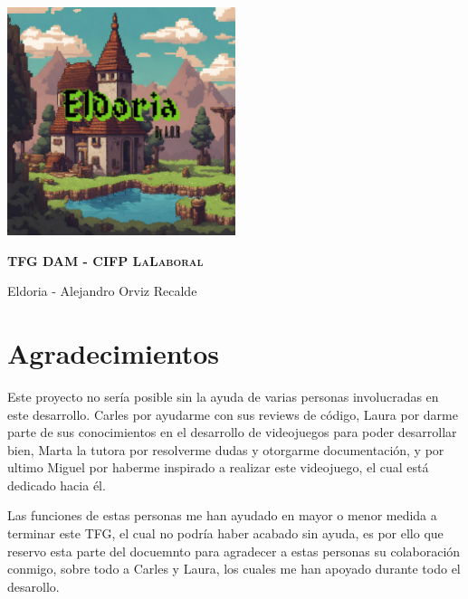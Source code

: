 \documentclass[a4paper]{article}
\begin{document}
\begin{titlepage}
    \centering %
    \includegraphics[width=0.5\textwidth]{Images/Eldoria.png}\par
    \vspace{0.4cm}
    {\scshape\LARGE\textbf{TFG DAM - CIFP LaLaboral}\par} %
    \vspace{0.4cm}
    {\LARGE\textcolor{bluePortada}{Eldoria - Alejandro Orviz Recalde}\par}
\end{titlepage}
\clearpage

\tableofcontents
\clearpage

\listoffigures
\clearpage

\listoftables
\clearpage
\section{Agradecimientos}
Este proyecto no sería posible sin la ayuda de varias personas involucradas en este desarrollo. Carles por ayudarme con sus reviews de código,
Laura por darme parte de sus conocimientos en el desarrollo de videojuegos para poder desarrollar bien, Marta la tutora por resolverme dudas y otorgarme
documentación, y por ultimo Miguel por haberme inspirado a realizar este videojuego, el cual está dedicado hacia él.

Las funciones de estas personas me han ayudado en mayor o menor medida a terminar este TFG, el cual no podría haber acabado sin ayuda, es por ello que reservo
esta parte del docuemnto para agradecer a estas personas su colaboración conmigo, sobre todo a Carles y Laura, los cuales me han apoyado durante todo el desarollo.
\clearpage
\end{document}
